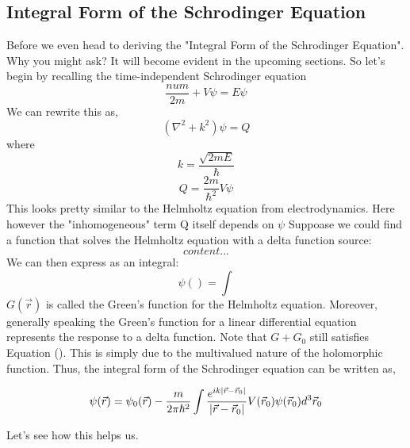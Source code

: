 \subsection{Integral Form of the Schrodinger Equation}
Before we even head to deriving the "Integral Form of the Schrodinger Equation". Why you might ask? It will become evident in the upcoming sections. So let's begin by recalling the time-independent Schrodinger equation
\begin{equation}
\frac{num}{2m} + V \psi = E \psi
\end{equation}
We can rewrite this as,
\begin{equation}
(\nabla^{2} + k^{2}) \psi = Q
\end{equation}
where
$$k = \frac{\sqrt{2mE}}{\hbar}$$
$$Q = \frac{2m}{\hbar^{2}}V \psi$$
This looks pretty similar to the Helmholtz equation from electrodynamics. Here however the "inhomogeneous" term Q itself depends on $\psi$
Suppoase we could find a function that solves the Helmholtz equation with a delta function source:
\begin{equation}
	content...
\end{equation}
We can then express as an integral:
\begin{equation}
	\psi() = \int
\end{equation}
$G(\vec{r})$ is called the Green's function for the Helmholtz equation. Moreover, generally speaking the Green's function for a linear differential equation represents the response to a delta function.
Note that $G + G_{0}$ still satisfies Equation (). This is simply due to the multivalued nature of the holomorphic function. Thus, the integral form of the Schrodinger equation can be written as,
\begin{tcolorbox}
\begin{equation}
\psi(\vec{r}) = \psi_{0}(\vec{r}) - \frac{m}{2 \pi \hbar^{2}}\int\frac{e^{ik\abs{\vec{r} - \vec{r}_{0}}}}{\abs{\vec{r} - \vec{r}_{0}}}  V(\vec{r}_{0}) \psi(\vec{r}_{0}) d^{3}\vec{r}_{0}
\end{equation}
\end{tcolorbox}
Let's see how this helps us.
